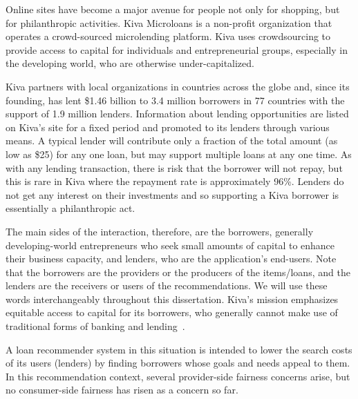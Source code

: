     
    
    Online sites have become a major avenue for people not only for shopping, but for philanthropic activities. Kiva Microloans is a non-profit organization that operates a crowd-sourced microlending platform. Kiva uses crowdsourcing to provide access to capital for individuals and entrepreneurial groups, especially in the developing world, who are otherwise under-capitalized.
    
    Kiva partners with local organizations in countries across the globe and, since its founding, has lent \$1.46 billion to 3.4 million borrowers in 77 countries with the support of 1.9 million lenders. Information about lending opportunities are listed on Kiva's site for a fixed period and promoted to its lenders through various means. A typical lender will contribute only a fraction of the total amount (as low as \$25) for any one loan, but may support multiple loans at any one time. As with any lending transaction, there is risk that the borrower will not repay, but this is rare in Kiva where the repayment rate is approximately 96\%. Lenders do not get any interest on their investments and so supporting a Kiva borrower is essentially a philanthropic act.

    The main sides of the interaction, therefore, are the borrowers, generally developing-world entrepreneurs who seek small amounts of capital to enhance their business capacity, and lenders, who are the application's end-users. Note that the borrowers are the providers or the producers of the items/loans, and the lenders are the receivers or users of the recommendations. We will use these words interchangeably throughout this dissertation. Kiva's mission emphasizes equitable access to capital for its borrowers, who generally cannot make use of traditional forms of banking and lending~\cite{Choo_understanding_kiva}.
    
    
    A loan recommender system in this situation is intended to lower the search costs of its users (lenders) by finding borrowers whose goals and needs appeal to them. In this recommendation context, several provider-side fairness concerns arise, but no consumer-side fairness has risen as a concern so far. 
    
